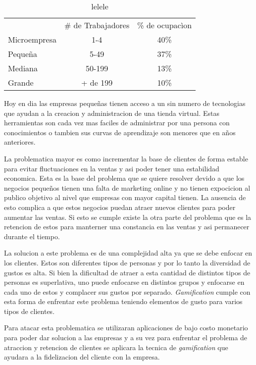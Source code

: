 \begin{table}[h]
\centering
\begin{tabular}{lcc}
             & \multicolumn{1}{l}{\# de Trabajadores} & \multicolumn{1}{l}{\% de ocupacìon} \\
Microempresa & 1-4                                    & 40\%                                \\
Pequeña      & 5-49                                   & 37\%                                \\
Mediana      & 50-199                                 & 13\%                                \\
Grande       & + de 199                               & 10\%                               
\end{tabular}
\caption[lala]{lelele}
\end{table}

Hoy en dia las empresas pequeñas tienen acceso a un sin numero de tecnologias que ayudan a la creacion y administracion 
de una tienda virtual. Estas herramientas son cada vez mas faciles de administrar por una persona con conocimientos o 
tambien sus curvas de aprendizaje son menores que en años anteriores. 

La problematica mayor es como incrementar la base de clientes de forma estable para evitar fluctuaciones en la ventas y
asi poder tener una estabilidad economica. Esta es la base del problema que se quiere resolver devido a que los
negocios pequeños tienen una falta de marketing online y no tienen expocicion al publico objetivo al nivel que empresas 
con mayor capital tienen. La ausencia de esto complica a que estos negocios puedan atraer nuevos clientes para poder
aumentar las ventas. Si esto se cumple existe la otra parte del problema que es la retencion de estos para manterner una constancia en las ventas y asi permanecer durante el tiempo.

La solucion a este problema es de una complejidad alta ya que se debe enfocar en los clientes. Estos son diferentes 
tipos de personas y por lo tanto la diversidad de gustos es alta. Si bien la dificultad de atraer a esta cantidad
de distintos tipos de personas es superlativa, uno puede enfocarse en distintos grupos y enfocarse en cada uno de 
estos y complacer sus gustos por separado. \emph{Gamification} cumple con esta forma de enfrentar este problema 
teniendo elementos de gusto para varios tipos de clientes.

Para atacar esta problematica se utilizaran aplicaciones de bajo costo monetario para poder dar solucion a las empresas y
a su vez para enfrentar el problema de atraccion y retencion de clientes se aplicara la tecnica de \emph{gamification} 
que ayudara a la fidelizacion del cliente con la empresa. 

